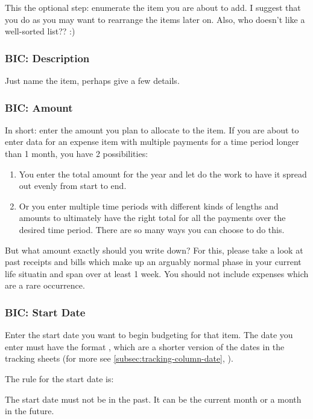 This the optional step: enumerate the item you are about to add.
I suggest that you do as you may want to rearrange the items later on.
Also, who doesn't like a well-sorted list?? :)

\subsubsection{BIC: Description}
\label{subsubsec:bic-description}

Just name the item, perhaps give a few details.

\subsubsection{BIC: Amount}
\label{subsubsec:bic-amount}

In short: enter the amount you plan to allocate to the item.
If you are about to enter data for an expense item with multiple payments for a time period longer than 1 month, you have 2 possibilities:
\begin{enumerate}
	\item You enter the total amount for the year and let \tfn do the work to have it spread out evenly from start to end.
	\item Or you enter multiple time periods with different kinds of lengths and amounts to ultimately have the right total for all the payments over the desired time period.
	There are so many ways you can choose to do this.
\end{enumerate}

But what amount exactly should you write down?
For this, please take a look at past receipts and bills which make up an arguably normal phase in your current life situatin and span over at least 1 week.
You should not include expenses which are a rare occurrence.

\subsubsection{BIC: Start Date}
\label{subsubsec:bic-start-date}

Enter the start date you want to begin budgeting for that item.
The date you enter must have the format , which are a shorter version of the dates in the tracking sheets (for more see \autoref{subsec:tracking-column-date}, ).

The rule for the start date is:
\begin{specialnote}
	The start date must not be in the past.
	It can be the current month or a month in the future.
\end{specialnote}


